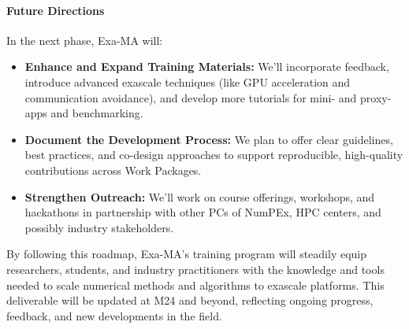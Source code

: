 \paragraph{Future Directions}
In the next phase, Exa-MA will:
\begin{itemize}
    \item \textbf{Enhance and Expand Training Materials:} We'll incorporate feedback, introduce advanced exascale techniques (like GPU acceleration and communication avoidance), and develop more tutorials for mini- and proxy-apps and benchmarking.
    \item \textbf{Document the Development Process:} We plan to offer clear guidelines, best practices, and co-design approaches to support reproducible, high-quality contributions across Work Packages.
    \item \textbf{Strengthen Outreach:} We'll work on course offerings, workshops, and hackathons in partnership with other PCs of NumPEx, HPC centers, and possibly industry stakeholders.
\end{itemize}

By following this roadmap, Exa-MA's training program will steadily equip researchers, students, and industry practitioners with the knowledge and tools needed to scale numerical methods and algorithms to exascale platforms. This deliverable will be updated at M24 and beyond, reflecting ongoing progress, feedback, and new developments in the field.